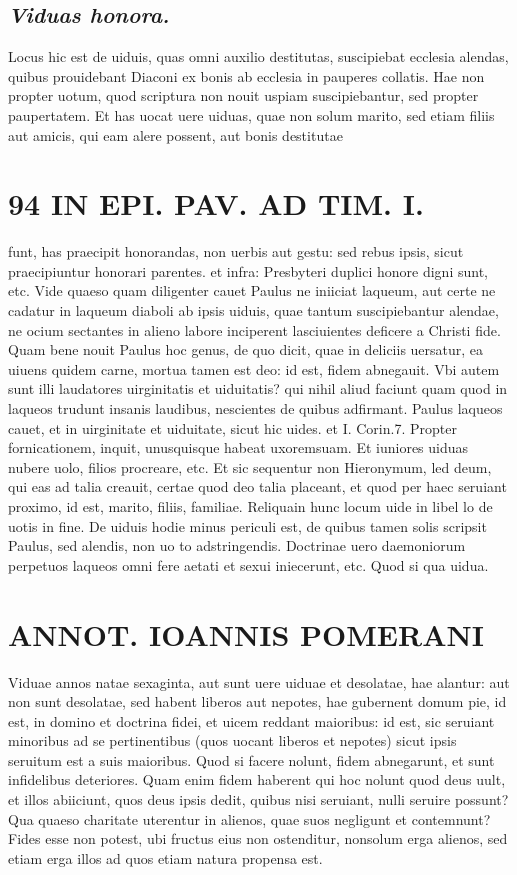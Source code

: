 \documentclass{article}
\begin{document}
\begin{pages}
\subsection*{\textit{Viduas honora. }}\pstart Locus hic est de uiduis, quas omni auxilio destitutas, suscipiebat ecclesia alendas, quibus prouidebant Diaconi ex bonis ab ecclesia in pauperes collatis. Hae non propter uotum, quod scriptura non nouit uspiam suscipiebantur, sed propter paupertatem. Et has uocat uere uiduas, quae non solum marito, sed etiam filiis aut amicis, qui eam alere possent, aut bonis destitutae  \pend
\section*{94 IN EPI. PAV. AD TIM. I. }
\marginpar{[ p.94 ]}\pstart funt, has praecipit honorandas, non uerbis aut gestu: sed rebus ipsis, sicut praecipiuntur honorari parentes. et infra: Presbyteri duplici honore digni sunt, etc. Vide quaeso quam diligenter cauet Paulus ne iniiciat laqueum, aut certe ne cadatur in laqueum diaboli ab ipsis uiduis, quae tantum suscipiebantur alendae, ne ocium sectantes in alieno labore inciperent lasciuientes deficere a Christi fide. Quam bene nouit Paulus hoc genus, de quo dicit, quae in deliciis uersatur, ea uiuens quidem carne, mortua tamen est deo: id est, fidem abnegauit. Vbi autem sunt illi laudatores uirginitatis et uiduitatis? qui nihil aliud faciunt quam quod in laqueos trudunt insanis laudibus, nescientes de quibus adfirmant. Paulus laqueos cauet, et in uirginitate et uiduitate, sicut hic uides. et I. Corin.7. Propter fornicationem, inquit, unusquisque habeat uxoremsuam. Et iuniores uiduas nubere uolo, filios procreare, etc. Et sic sequentur non Hieronymum, led deum, qui eas ad talia creauit, certae quod deo talia placeant, et quod per haec seruiant proximo, id est, marito, filiis, familiae. Reliquain hunc locum uide in libel lo de uotis in fine. De uiduis hodie minus periculi est, de quibus tamen solis scripsit Paulus, sed alendis, non uo to adstringendis. Doctrinae uero daemoniorum perpetuos laqueos omni fere aetati et sexui iniecerunt, etc.  \pend\pstart Quod si qua uidua.  \pend
\section*{ANNOT. IOANNIS POMERANI }\pstart Viduae annos natae sexaginta, aut sunt uere uiduae et desolatae, hae alantur: aut non sunt desolatae, sed habent liberos aut nepotes, hae gubernent domum pie, id est, in domino et doctrina fidei, et uicem reddant maioribus: id est, sic seruiant minoribus ad se pertinentibus (quos uocant liberos et nepotes) sicut ipsis seruitum est a suis maioribus. Quod si facere nolunt, fidem abnegarunt, et sunt infidelibus deteriores. Quam enim fidem haberent qui hoc nolunt quod deus uult, et illos abiiciunt, quos deus ipsis dedit, quibus nisi seruiant, nulli seruire possunt? Qua quaeso charitate uterentur in alienos, quae suos negligunt et contemnunt? Fides esse non potest, ubi fructus eius non ostenditur, nonsolum erga alienos, sed etiam erga illos ad quos etiam natura propensa est.  \pend
{}
{}

\end{pages}
\end{document}
